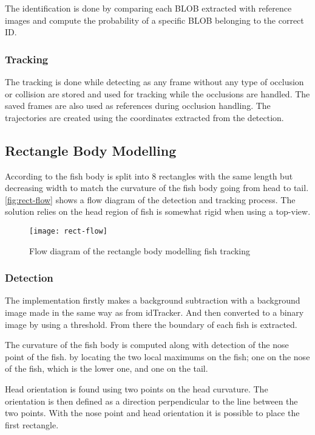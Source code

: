 The identification is done by comparing each BLOB extracted with reference images and compute the probability of a specific BLOB belonging to the correct ID.

\subsubsection{Tracking}
The tracking is done while detecting as any frame without any type of occlusion or collision are stored and used for tracking while the occlusions are handled. The saved frames are also used as references during occlusion handling. The trajectories are created using the coordinates extracted from the detection.

\subsection{Rectangle Body Modelling}
According to \cite{HongWang2016} the fish body is split into 8 rectangles with the same length but decreasing width to match the curvature of the fish body going from head to tail. \autoref{fig:rect-flow} shows a flow diagram of the detection and tracking process. The solution relies on the head region of fish is somewhat rigid when using a top-view.

\begin{figure}[H]
	\centering
	\texttt{[image: rect-flow]}
	\caption{Flow diagram of the rectangle body modelling fish tracking \citep{HongWang2016}}
	\label{fig:rect-flow}
\end{figure}

\subsubsection{Detection}
The implementation firstly makes a background subtraction with a background image made in the same way as from idTracker. And then converted to a binary image by using a threshold. From there the boundary of each fish is extracted.

The curvature of the fish body is computed along with detection of the nose point of the fish. by locating the two local maximums on the fish; one on the nose of the fish, which is the lower one, and one on the tail.

Head orientation is found using two points on the head curvature. The orientation is then defined as a direction perpendicular to the line between the two points. With the nose point and head orientation it is possible to place the first rectangle.

